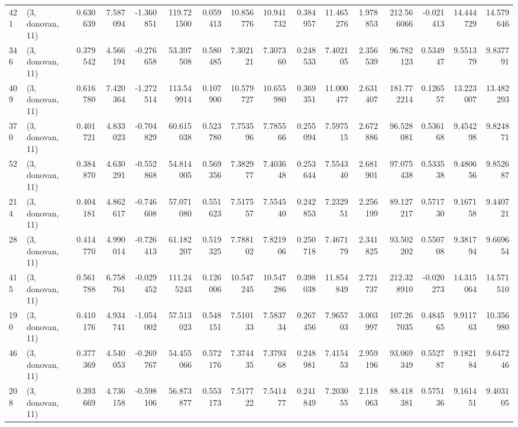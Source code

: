 \begin{tabular}{llrrrrrrrrrrrrrr}
421 &  (3, donovan, 11) &   0.630639 &   7.587094 &  -1.360851 &   119.721500 &   0.059413 &  10.856776 &  10.941732 &  0.384957 &  11.465276 &   1.978853 &   212.566066 & -0.021413 &  14.444729 &  14.579646 \\
346 &  (3, donovan, 11) &   0.379542 &   4.566194 &  -0.276658 &    53.397508 &   0.580485 &   7.302121 &   7.307360 &  0.248533 &   7.402105 &   2.356539 &    96.782123 &  0.534947 &   9.551379 &   9.837791 \\
409 &  (3, donovan, 11) &   0.616780 &   7.420364 &  -1.272514 &   113.549914 &   0.107900 &  10.579727 &  10.655980 &  0.369351 &  11.000477 &   2.631407 &   181.772214 &  0.126557 &  13.223007 &  13.482293 \\
370 &  (3, donovan, 11) &   0.401721 &   4.833023 &  -0.704829 &    60.615038 &   0.523780 &   7.753596 &   7.785566 &  0.255094 &   7.597515 &   2.672886 &    96.528081 &  0.536168 &   9.454298 &   9.824871 \\
52  &  (3, donovan, 11) &   0.384870 &   4.630291 &  -0.552868 &    54.814005 &   0.569356 &   7.382977 &   7.403648 &  0.253644 &   7.554340 &   2.681901 &    97.075438 &  0.533538 &   9.480656 &   9.852687 \\
214 &  (3, donovan, 11) &   0.404181 &   4.862617 &  -0.746608 &    57.071080 &   0.551623 &   7.517557 &   7.554540 &  0.242853 &   7.232951 &   2.256199 &    89.127217 &  0.571730 &   9.167158 &   9.440721 \\
28  &  (3, donovan, 11) &   0.414770 &   4.990014 &  -0.726413 &    61.182207 &   0.519325 &   7.788102 &   7.821906 &  0.250718 &   7.467179 &   2.341825 &    93.502202 &  0.550708 &   9.381794 &   9.669654 \\
415 &  (3, donovan, 11) &   0.561788 &   6.758761 &  -0.029452 &   111.245243 &   0.126006 &  10.547245 &  10.547286 &  0.398038 &  11.854849 &   2.721737 &   212.328910 & -0.020273 &  14.315064 &  14.571510 \\
190 &  (3, donovan, 11) &   0.410176 &   4.934741 &  -1.054002 &    57.513023 &   0.548151 &   7.510133 &   7.583734 &  0.267456 &   7.965703 &   3.003997 &   107.267035 &  0.484565 &   9.911763 &  10.356980 \\
46  &  (3, donovan, 11) &   0.377369 &   4.540053 &  -0.269767 &    54.455066 &   0.572176 &   7.374435 &   7.379368 &  0.248981 &   7.415453 &   2.959196 &    93.069349 &  0.552787 &   9.182184 &   9.647246 \\
208 &  (3, donovan, 11) &   0.393669 &   4.736158 &  -0.598106 &    56.873877 &   0.553173 &   7.517722 &   7.541477 &  0.241849 &   7.203055 &   2.118063 &    88.418381 &  0.575136 &   9.161451 &   9.403105 \\

\end{tabular}
